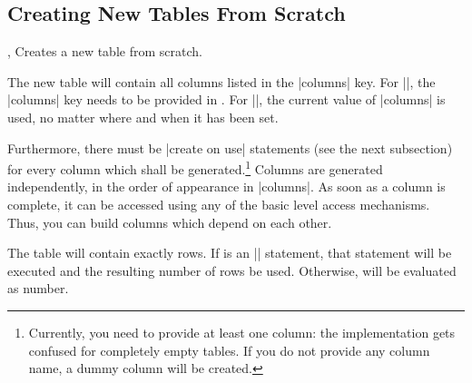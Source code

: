\subsection{Creating New Tables From Scratch}

\begin{commandlist}{%
    \pgfplotstablenew{},
    \pgfplotstablenew*{}%
}
    Creates a new table from scratch.

    The new table will contain all columns listed in the |columns| key. For
    |\pgfplotstablenew|, the |columns| key needs to be provided in
    . For |\pgfplotstablenew*|, the current value of |columns| is
    used, no matter where and when it has been set.

    Furthermore, there must be |create on use| statements (see the next
    subsection) for every column which shall be generated.\footnote{Currently,
    you need to provide at least one column: the implementation gets confused
    for completely empty tables. If you do not provide any column name, a dummy
    column will be created.} Columns are generated independently, in the order
    of appearance in |columns|. As soon as a column is complete, it can be
    accessed using any of the basic level access mechanisms. Thus, you can
    build columns which depend on each other.

    The table will contain exactly  rows. If 
    is an |\pgfplotstablegetrowsof| statement, that statement will be executed
    and the resulting number of rows be used. Otherwise,  will
    be evaluated as number.
\begin{codeexample}[pre={\begin{lateximage}},post={\end{lateximage}}]
\loadedtable
\pgfplotstabletypeset[empty cells with={---}]\loadedtable
\end{codeexample}

\begin{codeexample}[pre={\begin{lateximage}},post={\end{lateximage}}]
    \loadedtable
\pgfplotstabletypeset\loadedtable
\end{codeexample}
\end{commandlist}

